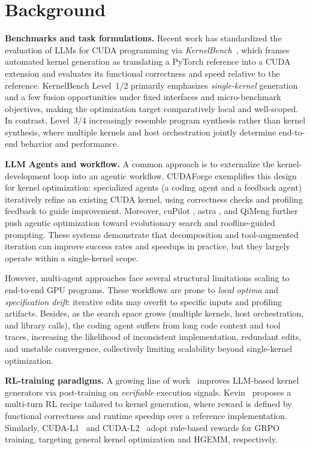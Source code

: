 \section{Background}

\label{sec:background}


\textbf{Benchmarks and task formulations.}
Recent work has standardized the evaluation of LLMs for CUDA programming via \emph{KernelBench}~\cite{kernelbench}, which frames automated kernel generation as translating a PyTorch reference into a CUDA extension and evaluates its functional correctness and speed relative to the reference. KernelBench Level~1/2 primarily emphasizes \emph{single-kernel} generation and a few fusion opportunities under fixed interfaces and micro-benchmark objectives, making the optimization target comparatively local and well-scoped. In contrast, Level~3/4 increasingly resemble program synthesis rather than kernel synthesis, where multiple kernels and host orchestration jointly determine end-to-end behavior and performance. 

\textbf{LLM Agents and workflow.}
A common approach is to externalize the kernel-development loop into an agentic workflow. CUDAForge \cite{cudaforge} exemplifies this design for kernel optimization: specialized agents (a coding agent and a feedback agent) iteratively refine an existing CUDA kernel, using correctness checks and profiling feedback to guide improvement. Moreover,
cuPilot \cite{cupilot}, astra \cite{astra}, and QiMeng \cite{qimeng} further push agentic optimization toward evolutionary search and roofline-guided prompting.
These systems demonstrate that decomposition and tool-augmented iteration can improve success rates and speedups in practice, but they largely operate within a single-kernel scope. 

However, multi-agent approaches face several structural limitations scaling to end-to-end GPU programs. These workflows are prone to \emph{local optima} and \emph{specification drift}: iterative edits may overfit to specific inputs and profiling artifacts. Besides, as the search space grows (multiple kernels, host orchestration, and library calls), the coding agent suffers from long code context and tool traces, increasing the likelihood of inconsistent implementation, redundant edits, and unstable convergence, collectively limiting scalability beyond single-kernel optimization.


\textbf{RL-training paradigms.}
A growing line of work~\cite{kevin,cudal2,li2025cudal1improvingcudaoptimization} improves LLM-based kernel generators via post-training on \emph{verifiable} execution signals. Kevin~\cite{kevin} proposes a multi-turn RL recipe tailored to kernel generation, where reward is defined by functional correctness and runtime speedup over a reference implementation. Similarly, CUDA-L1~\cite{li2025cudal1improvingcudaoptimization} and CUDA-L2~\cite{cudal2} adopt rule-based rewards for GRPO training, targeting general kernel optimization and HGEMM, respectively.

